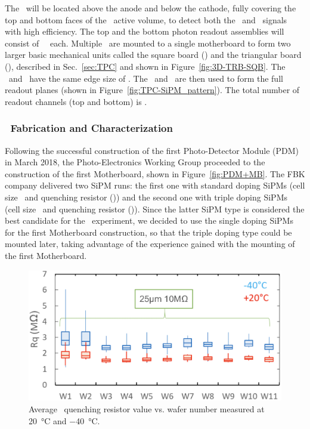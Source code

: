 The \DSkPdms\ will be located above the anode and below the cathode, fully covering the top and bottom faces of the \LArTPC\ active volume, to detect both the \SOne\ and \STwo\ signals with high efficiency.  The top and the bottom photon readout assemblies will consist of \DSkTilesHalfNumber\ \DSkPdms\ each.  Multiple \DSkPdms\ are mounted to a single motherboard to form two larger basic mechanical units called the square board (\SQB)  and the triangular board (\TRB),  described in Sec.~\ref{sec:TPC} and shown  in Figure~\ref{fig:3D-TRB-SQB}.  The \SQB\ and \TRB\ have the same edge size of \DSkSQBTRBSize.  The \SQB\ and \TRB\ are then used to form the full readout planes (shown in Figure~\ref{fig:TPC-SiPM_pattern}).  The total number of readout channels (top and bottom) is \DSkTilesNumber.


\subsubsection{\DSkPdm\ Fabrication and Characterization}

Following the successful construction of the first Photo-Detector Module (PDM) in March 2018, the Photo-Electronics Working Group proceeded to the construction of the first Motherboard, shown in  Figure~\ref{fig:PDM+MB}. The FBK company delivered two SiPM runs: the first one with standard doping SiPMs (cell size \DSkSiPMSPADSizeStd\ and quenching resistor \DSkSiPMSPADQuenchingResistorSingleDoping(\LINNormalTemperature)) and the second one with triple doping SiPMs (cell size \DSkSiPMSPADSizeTripleDoping\ and quenching resistor \DSkSiPMSPADQuenchingResistorTripleDoping(\LINNormalTemperature)). Since the latter SiPM type is considered the best candidate for the \DSks\ experiment, we decided to use the single doping SiPMs for the first Motherboard construction, so that the triple doping type could be mounted later, taking advantage of the experience gained with the mounting of the first Motherboard.

\begin{figure} [t]
\includegraphics[width=\columnwidth]{./Figures/Rq.png}
\caption[Variance of impedance of \SiPMs\ quenching resistors]{Average \SiPM\ quenching resistor value vs. wafer number measured at \SI{20}{\celsius} and \SI{-40}{\celsius}.}
\label{fig:Rq} 
\end{figure} 

